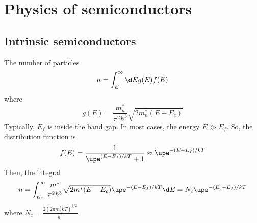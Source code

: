 
\chapter{Physics of semiconductors}

\section{Intrinsic semiconductors}

The number of particles
\begin{equation}
  n = \int_{E_c}^\infty \d E g(E) f(E)
\end{equation}
where
\[
  g(E) = \frac{m_n^*}{\pi^2\hbar^3} \sqrt{2m_n^*(E - E_c)}
\]
Typically, $E_f$ is inside the band gap.
In most cases, the energy $E \gg E_f$.
So, the distribution function is
\[
  f(E) = \frac1{\upe^{(E-E_f)/kT} + 1} \approx \upe^{-(E-E_f)/kT}
\]
Then, the integral
\begin{equation}
  n = \int_{E_c}^\infty \frac{m^*}{\pi^2\hbar^3} \sqrt{2m^*(E - E_c)}
      \upe^{-(E-E_f)/kT} \d E = N_c\upe^{-(E_c-E_f)/kT}
\end{equation}
where $N_c = \frac{2(2\pi m_e^* kT)^{3/2}}{h^3}$.

